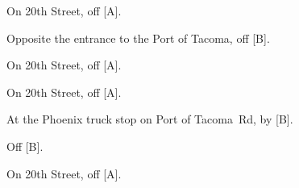 
\begin{LocationList}

On 20th Street, off  [A].

Opposite the entrance to the Port of Tacoma, off  [B].

On 20th Street, off  [A].

On 20th Street, off  [A].

At the Phoenix truck stop on Port of Tacoma~Rd, by  [B].

Off  [B].

On 20th Street, off  [A].

\end{LocationList}
